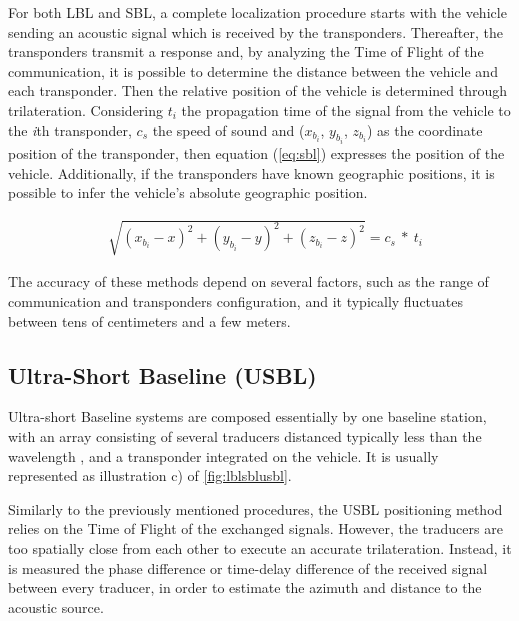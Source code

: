 For both LBL and SBL, a complete localization procedure starts with the vehicle sending an acoustic signal which is received by the transponders. Thereafter, the transponders transmit a response and, by analyzing the Time of Flight of the communication, it is possible to determine the distance between the vehicle and each transponder. Then the relative position of the vehicle is determined through trilateration. Considering $t_{i}$ the propagation time of the signal from the vehicle to the \textit{i}th transponder, $c_s$ the speed of sound and ($x_{b_{i}}$, $y_{b_{i}}$, $z_{b_{i}}$) as the coordinate position of the transponder, then equation (\ref{eq:sbl}) \cite{sbl} expresses the position of the vehicle. Additionally, if the transponders have known geographic positions, it is possible to infer the vehicle's absolute geographic position. 

\begin{eqnarray}
	&\sqrt{ (x_{b_{i}}-x)^2 + (y_{b_{i}}-y)^2 + (z_{b_{i}}-z)^2 } = c_s\ *\ t_{i}
	\label{eq:sbl}
\end{eqnarray}


The accuracy of these methods depend on several factors, such as the range of communication and transponders configuration, and it typically fluctuates between tens of centimeters and a few meters.


\subsection{Ultra-Short Baseline (USBL)}

Ultra-short Baseline systems are composed essentially by one baseline station, with an array consisting of several traducers distanced typically less than the wavelength \cite{lblsblusbl}, and a transponder integrated on the vehicle. It is usually represented as illustration c) of \ref{fig:lblsblusbl}.

Similarly to the previously mentioned procedures, the USBL positioning method relies on the Time of Flight of the exchanged signals. However, the traducers are too spatially close from each other to execute an accurate trilateration. Instead, it is measured the phase difference or time-delay difference of the received signal between every traducer, in order to estimate the azimuth and distance to the acoustic source. 

